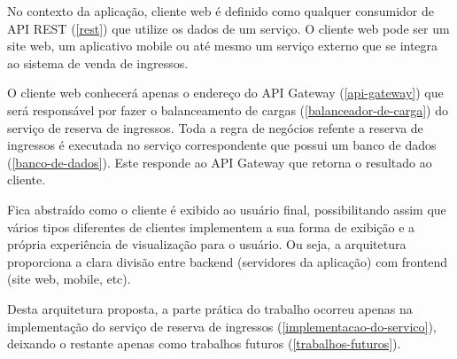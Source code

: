 No contexto da aplicação, cliente web é definido como qualquer consumidor
de API REST (\autoref{rest}) que utilize os dados de um serviço.
O cliente web pode ser um site web, um aplicativo mobile ou até mesmo um serviço
externo que se integra ao sistema de venda de ingressos.

O cliente web conhecerá apenas o endereço do API Gateway (\autoref{api-gateway})
que será responsável por fazer o balanceamento de cargas
(\autoref{balanceador-de-carga}) do serviço de reserva de ingressos.
Toda a regra de negócios refente a reserva de ingressos é executada no
serviço correspondente que possui um banco de dados (\autoref{banco-de-dados}).
Este responde ao API Gateway que retorna o resultado ao cliente.

Fica abstraído como o cliente é exibido ao usuário
final, possibilitando assim que vários tipos diferentes de clientes implementem
a sua forma de exibição e a própria experiência de visualização para o usuário.
Ou seja, a arquitetura proporciona a clara divisão entre backend
(servidores da aplicação) com frontend (site web, mobile, etc).

Desta arquitetura proposta, a parte prática do trabalho ocorreu apenas na
implementação do serviço de reserva de ingressos (\autoref{implementacao-do-servico}),
deixando o restante apenas como trabalhos futuros (\autoref{trabalhos-futuros}).
